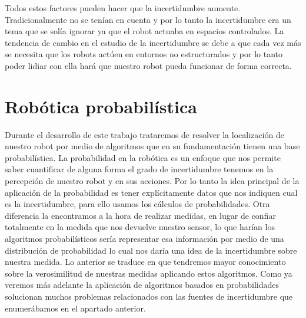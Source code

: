 Todos estos factores pueden hacer que la incertidumbre aumente. Tradicionalmente no se tenían en cuenta y por lo tanto la incertidumbre era un tema que se solía ignorar ya que el robot actuaba en espacios controlados. La tendencia de cambio en el estudio de la incertidumbre se debe a que cada vez más se necesita que los robots actúen en entornos no estructurados y por lo tanto poder lidiar con ella hará que nuestro robot pueda funcionar de forma correcta.

\section{Robótica probabilística}

Durante el desarrollo de este trabajo trataremos de resolver la localización de nuestro robot por medio de algoritmos que en su fundamentación tienen una base probabilística. La probabilidad en la robótica es un enfoque que nos permite saber cuantificar de alguna forma el grado de incertidumbre tenemos en la percepción de nuestro robot y en sus acciones. Por lo tanto la idea principal de la aplicación de la probabilidad es tener explícitamente datos que nos indiquen cual es la incertidumbre, para ello usamos los cálculos de probabilidades. Otra diferencia la encontramos a la hora de realizar medidas, en lugar de confiar totalmente en la medida que nos devuelve nuestro sensor, lo que harían los algoritmos probabilísticos sería representar esa información por medio de una distribución de probabilidad lo cual nos daría una idea de la incertidumbre sobre nuestra medida. Lo anterior se traduce en que tendremos mayor conocimiento sobre la verosimilitud de nuestras medidas aplicando estos algoritmos. Como ya veremos más adelante la aplicación de algoritmos basados en probabilidades solucionan muchos problemas relacionados con las fuentes de incertidumbre que enumerábamos en el apartado anterior.
%
%
%
%
%
%
%
%
%
%

